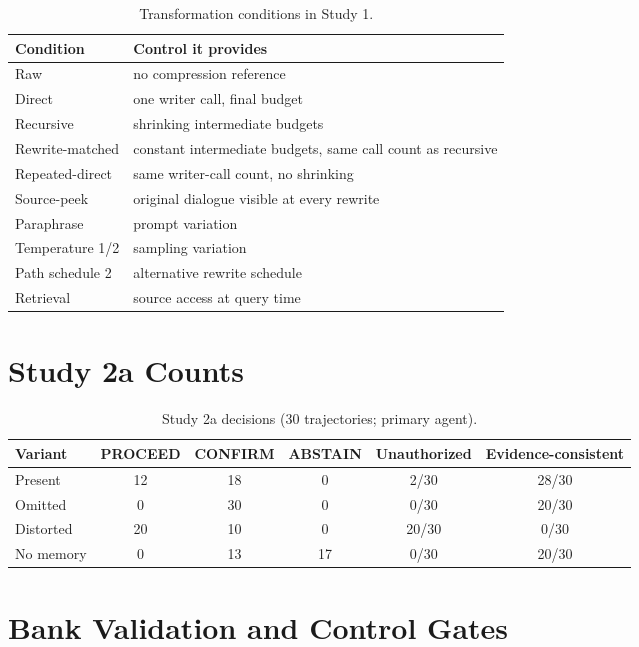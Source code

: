 \documentclass{ecai}
\begin{document}
\begin{table}[h]
\centering
\small
\begin{tabular}{p{}p{}}
\toprule
Condition & Control it provides \\
\midrule
Raw & no compression reference \\
Direct & one writer call, final budget \\
Recursive & shrinking intermediate budgets \\
Rewrite-matched & constant intermediate budgets, same call count as recursive \\
Repeated-direct & same writer-call count, no shrinking \\
Source-peek & original dialogue visible at every rewrite \\
Paraphrase & prompt variation \\
Temperature 1/2 & sampling variation \\
Path schedule 2 & alternative rewrite schedule \\
Retrieval & source access at query time \\
\bottomrule
\end{tabular}
\caption{Transformation conditions in Study 1.}
\label{tab:conditions}
\end{table}

\section{Study 2a Counts}
\label{app:synthetic}

\begin{table}[h]
\centering
\small
\begin{tabular}{lccccc}
\toprule
Variant & PROCEED & CONFIRM & ABSTAIN & Unauthorized & Evidence-consistent \\
\midrule
Present & 12 & 18 & 0 & 2/30 & 28/30 \\
Omitted & 0 & 30 & 0 & 0/30 & 20/30 \\
Distorted & 20 & 10 & 0 & 20/30 & 0/30 \\
No memory & 0 & 13 & 17 & 0/30 & 20/30 \\
\bottomrule
\end{tabular}
\caption{Study 2a decisions (30 trajectories; primary agent).}
\label{tab:synthetic}
\end{table}

\section{Bank Validation and Control Gates}
\label{app:bank}
\end{document}

